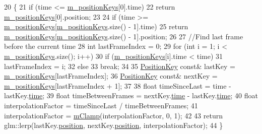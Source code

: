 \begin{DoxyCode}
20 \{
21   \textcolor{keywordflow}{if} (time <= \hyperlink{class_bone_key_sequence_acae9becd7de02c955da5d64050513ce5}{m\_positionKeys}[0].time)
22     \textcolor{keywordflow}{return} \hyperlink{class_bone_key_sequence_acae9becd7de02c955da5d64050513ce5}{m\_positionKeys}[0].position;
23 
24   \textcolor{keywordflow}{if} (time >= \hyperlink{class_bone_key_sequence_acae9becd7de02c955da5d64050513ce5}{m\_positionKeys}[\hyperlink{class_bone_key_sequence_acae9becd7de02c955da5d64050513ce5}{m\_positionKeys}.size() - 1].time)
25     \textcolor{keywordflow}{return} \hyperlink{class_bone_key_sequence_acae9becd7de02c955da5d64050513ce5}{m\_positionKeys}[\hyperlink{class_bone_key_sequence_acae9becd7de02c955da5d64050513ce5}{m\_positionKeys}.size() - 1].position;
26 
27   \textcolor{comment}{//Find last frame before the current time}
28   \textcolor{keywordtype}{int} lastFrameIndex = 0;
29   \textcolor{keywordflow}{for} (\textcolor{keywordtype}{int} i = 1; i < \hyperlink{class_bone_key_sequence_acae9becd7de02c955da5d64050513ce5}{m\_positionKeys}.size(); i++)
30     \textcolor{keywordflow}{if} (\hyperlink{class_bone_key_sequence_acae9becd7de02c955da5d64050513ce5}{m\_positionKeys}[i].time < time)
31       lastFrameIndex = i;
32     \textcolor{keywordflow}{else}
33       \textcolor{keywordflow}{break};
34 
35   \hyperlink{struct_position_key}{PositionKey} \textcolor{keyword}{const}& lastKey = \hyperlink{class_bone_key_sequence_acae9becd7de02c955da5d64050513ce5}{m\_positionKeys}[lastFrameIndex];
36   \hyperlink{struct_position_key}{PositionKey} \textcolor{keyword}{const}& nextKey = \hyperlink{class_bone_key_sequence_acae9becd7de02c955da5d64050513ce5}{m\_positionKeys}[lastFrameIndex + 1];
37   
38   \textcolor{keywordtype}{float} timeSinceLast = time - lastKey.\hyperlink{struct_position_key_ab18d1c0baf9f835e2dbd8b8663d552f4}{time};
39   \textcolor{keywordtype}{float} timeBetweenFrames = nextKey.\hyperlink{struct_position_key_ab18d1c0baf9f835e2dbd8b8663d552f4}{time} - lastKey.\hyperlink{struct_position_key_ab18d1c0baf9f835e2dbd8b8663d552f4}{time};
40   \textcolor{keywordtype}{float} interpolationFactor = timeSinceLast / timeBetweenFrames;
41   interpolationFactor = \hyperlink{_m_math_8h_a35bcf6994210feb2d96d1d22df3385ea}{mClamp}(interpolationFactor, 0, 1);
42   
43   \textcolor{keywordflow}{return} glm::lerp(lastKey.\hyperlink{struct_position_key_a6b7f3212adb099bc1b5d86513ef2fd36}{position}, nextKey.\hyperlink{struct_position_key_a6b7f3212adb099bc1b5d86513ef2fd36}{position}, interpolationFactor);
44 \}
\end{DoxyCode}


